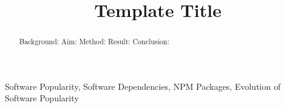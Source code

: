 \documentclass[10pt, conference]{IEEEtran}
\begin{document}
\title{Template Title}



\maketitle

\begin{abstract}
Background: 
Aim: 
Method: 
Result: 
Conclusion: 
\end{abstract}

\begin{IEEEkeywords}
Software Popularity, Software Dependencies, NPM Packages, Evolution of Software Popularity
\end{IEEEkeywords}





\balance


\end{document}
